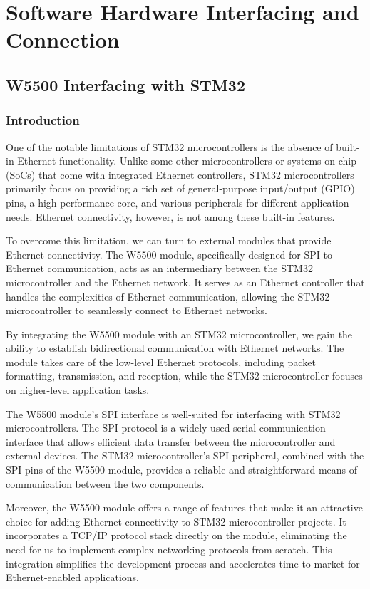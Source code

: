 \documentclass[
12pt,
oneside, 
onehalfspacing, 
nolistspacing, 
parskip, 
chapterinoneline, 
]{AASTCOMPUTER}
\begin{document}
\chapter{Software Hardware Interfacing and Connection}
\section{W5500 Interfacing with STM32}
\subsection{Introduction}
One of the notable limitations of STM32 microcontrollers is the absence of built-in Ethernet functionality. Unlike some other microcontrollers or systems-on-chip (SoCs) that come with integrated Ethernet controllers, STM32 microcontrollers primarily focus on providing a rich set of general-purpose input/output (GPIO) pins, a high-performance core, and various peripherals for different application needs. Ethernet connectivity, however, is not among these built-in features.

To overcome this limitation, we can turn to external modules that provide Ethernet connectivity. The W5500 module, specifically designed for SPI-to-Ethernet communication, acts as an intermediary between the STM32 microcontroller and the Ethernet network. It serves as an Ethernet controller that handles the complexities of Ethernet communication, allowing the STM32 microcontroller to seamlessly connect to Ethernet networks.

By integrating the W5500 module with an STM32 microcontroller, we gain the ability to establish bidirectional communication with Ethernet networks. The module takes care of the low-level Ethernet protocols, including packet formatting, transmission, and reception, while the STM32 microcontroller focuses on higher-level application tasks.

The W5500 module's SPI interface is well-suited for interfacing with STM32 microcontrollers. The SPI protocol is a widely used serial communication interface that allows efficient data transfer between the microcontroller and external devices. The STM32 microcontroller's SPI peripheral, combined with the SPI pins of the W5500 module, provides a reliable and straightforward means of communication between the two components.

Moreover, the W5500 module offers a range of features that make it an attractive choice for adding Ethernet connectivity to STM32 microcontroller projects. It incorporates a TCP/IP protocol stack directly on the module, eliminating the need for us to implement complex networking protocols from scratch. This integration simplifies the development process and accelerates time-to-market for Ethernet-enabled applications.
\end{document}
